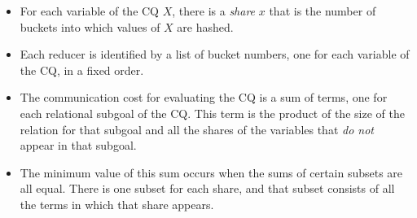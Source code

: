 \begin{itemize}

\item
For each variable of the CQ $X$, there is a {\em share} $x$ that is the number of buckets into which values of $X$ are hashed.

\item
Each reducer is identified by a list of bucket numbers, one for each variable of the CQ, in a fixed order.

\item
The communication cost for evaluating the CQ is a sum of terms, one for each relational subgoal of the CQ.  This term is the product of the size of the relation for that subgoal and all the shares of the variables that {\em do not} appear in that subgoal.

\item
The minimum value of this sum occurs when the sums of certain subsets are all equal.  There is one subset for each share, and that subset consists of all the terms in which that share appears.

\end{itemize}

